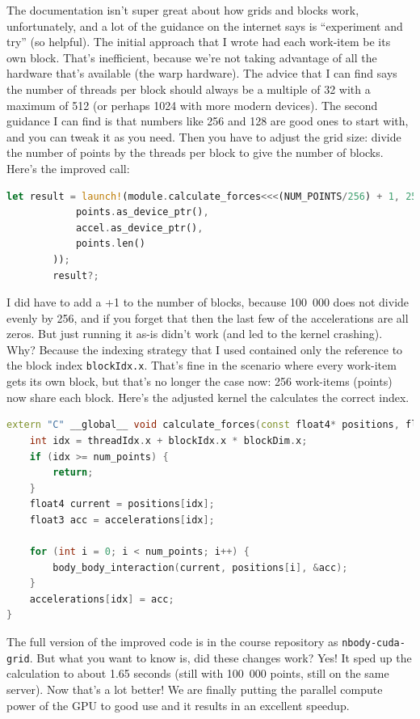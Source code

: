 The documentation isn't super great about how grids and blocks work, unfortunately, and a lot of the guidance on the internet says is ``experiment and try'' (so helpful). The initial approach that I wrote had each work-item be its own block. That's inefficient, because we're not taking advantage of all the hardware that's available (the warp hardware). The advice that I can find says the number of threads per block should always be a multiple of 32 with a maximum of 512 (or perhaps 1024 with more modern devices). The second guidance I can find is that numbers like 256 and 128 are good ones to start with, and you can tweak it as you need. Then you have to adjust the grid size: divide the number of points by the threads per block to give the number of blocks. Here's the improved call:

\begin{lstlisting}[language=Rust]
        let result = launch!(module.calculate_forces<<<(NUM_POINTS/256) + 1, 256, 0, stream>>>(
            points.as_device_ptr(),
            accel.as_device_ptr(),
            points.len()
        ));
        result?;
\end{lstlisting}

I did have to add a +1 to the number of blocks, because 100~000 does not divide evenly by 256, and if you forget that then the last few of the accelerations are all zeros. But just running it as-is didn't work (and led to the kernel crashing). Why? Because the indexing strategy that I used contained only the reference to the block index \texttt{blockIdx.x}. That's fine in the scenario where every work-item gets its own block, but that's no longer the case now: 256 work-items (points) now share each block. Here's the adjusted kernel the calculates the correct index. 

\begin{lstlisting}[language=C++]
extern "C" __global__ void calculate_forces(const float4* positions, float3* accelerations, int num_points) {
    int idx = threadIdx.x + blockIdx.x * blockDim.x;
    if (idx >= num_points) {
        return;
    }
    float4 current = positions[idx];
    float3 acc = accelerations[idx];

    for (int i = 0; i < num_points; i++) {
        body_body_interaction(current, positions[i], &acc);
    }
    accelerations[idx] = acc;
}
\end{lstlisting}

The full version of the improved code is in the course repository as \texttt{nbody-cuda-grid}. But what you want to know is, did these changes work? Yes! It sped up the calculation to about 1.65 seconds (still with 100~000 points, still on the same server). Now that's a lot better! We are finally putting the parallel compute power of the GPU to good use and it results in an excellent speedup.

